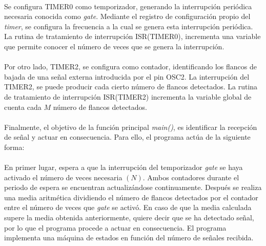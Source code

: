 \paragraph{}
Se configura TIMER0 como temporizador, generando la interrupci\'on periódica necesaria conocida como \textit{gate}. Mediante el registro de configuración propio del \textit{timer}, se configura la frecuencia a la cual se genera esta interrupción peri\'odica. La rutina de tratamiento de interrupción ISR(TIMER0), incrementa una variable que permite conocer el n\'umero de veces que se genera la interrupci\'on.
\paragraph{}
Por otro lado, TIMER2, se configura como contador, identificando los flancos de bajada de una señal externa introducida por el pin OSC2. La interrupción del TIMER2, se puede producir cada cierto número de flancos detectados. La rutina de tratamiento de interrupción ISR(TIMER2) incrementa la variable global de cuenta cada $M$ n\'umero de flancos detectados.

\paragraph{}
Finalmente, el objetivo de la funci\'on principal \textit{main()}, es identificar la recepci\'on de señal y actuar en consecuencia.
Para ello, el programa actúa de la siguiente forma: 
\paragraph{}
En primer lugar, espera a que la interrupci\'on del temporizador \textit{gate} se haya activado el número de veces necesaria $(N)$. Ambos contadores durante el periodo de espera se encuentran actualiz\'andose continuamente.
Después se realiza una media aritmética dividiendo el número de flancos detectados por el contador entre el número de veces que \textit{gate} se activó.
En caso de que la media calculada supere la media obtenida anteriormente, quiere decir que se ha detectado señal, por lo que el programa procede a actuar en consecuencia.
El programa implementa una máquina de estados en función del número de señales recibida.

